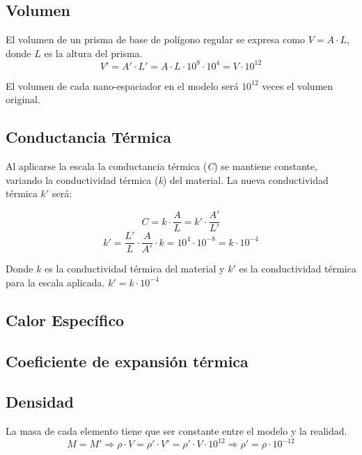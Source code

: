 \subsection{Volumen}
El volumen de un prisma de base de polígono regular se expresa como $V=A\cdot L$, donde $L$ es la altura del prisma.
\begin{equation}
	V'=A'\cdot L' = A\cdot L \cdot 10^8\cdot 10^4= V\cdot 10^12
\end{equation}

El volumen de cada nano-espaciador en el modelo será $10^12$ veces el volumen original.
\subsection{Conductancia Térmica}

Al aplicarse la escala la conductancia térmica (\textit{C}) se mantiene constante, variando la conductividad térmica (\textit{k}) del material. La nueva conductividad térmica $k'$ será:

\begin{equation}
	C=k\cdot \frac{A}{L}=k'\cdot\frac{A'}{L'}
\end{equation}
\begin{equation}	
	 k'=\dfrac{L'}{L} \cdot \dfrac{A}{A'} \cdot k=10^4\cdot 10^{-8}=k\cdot 10^{-4}
\end{equation}

Donde $k$ es la conductividad térmica del material  y $k'$ es la conductividad térmica para la escala aplicada. $k'=k\cdot10^{-4}$

\subsection{Calor Específico}

\subsection{Coeficiente de expansión térmica}

\subsection{Densidad}
La masa de cada elemento tiene que ser constante entre el modelo y la realidad.
\begin{equation}
	M=M'\Longrightarrow \rho\cdot V=\rho'\cdot V'= \rho'\cdot V\cdot {10}^{12}\Longrightarrow \rho'=\rho\cdot{10}^{-12}
\end{equation}

